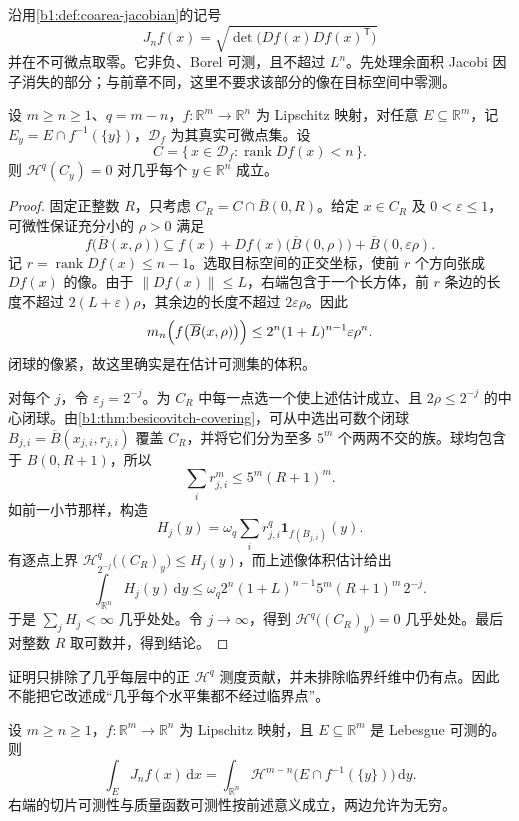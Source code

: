 沿用\cref{b1:def:coarea-jacobian}的记号
\[
 J_nf(x)
 =\sqrt{\det\bigl(Df(x)Df(x)^{\mathsf T}\bigr)}
\]
并在不可微点取零。它非负、Borel 可测，且不超过 \(L^n\)。先处理余面积 Jacobi 因子消失的部分；与前章不同，这里不要求该部分的像在目标空间中零测。

\begin{lemma}\label{b1:lem:critical-set-slices}
设 \(m\ge n\ge1\)、\(q=m-n\)，\(f:\mathbb R^m\to\mathbb R^n\) 为 Lipschitz 映射，对任意 \(E\subseteq\mathbb R^m\)，记 \(E_y=E\cap f^{-1}(\{y\})\)，\(\mathcal D_f\) 为其真实可微点集。设
\[
 C=\{\,x\in\mathcal D_f:\operatorname{rank}Df(x)<n\,\}.
\]
则 \(\mathcal H^q(C_y)=0\) 对几乎每个 \(y\in\mathbb R^n\) 成立。
\end{lemma}
\begin{proof}
固定正整数 \(R\)，只考虑 \(C_R=C\cap\overline B(0,R)\)。给定 \(x\in C_R\) 及 \(0<\varepsilon\leq1\)，可微性保证充分小的 \(\rho>0\) 满足
\[
 f\bigl(\overline B(x,\rho)\bigr)
 \subseteq f(x)+Df(x)\bigl(\overline B(0,\rho)\bigr)
                   +\overline B(0,\varepsilon\rho).
\]
记 \(r=\operatorname{rank}Df(x)\leq n-1\)。选取目标空间的正交坐标，使前 \(r\) 个方向张成 \(Df(x)\) 的像。由于 \(\|Df(x)\|\leq L\)，右端包含于一个长方体，前 \(r\) 条边的长度不超过 \(2(L+\varepsilon)\rho\)，其余边的长度不超过 \(2\varepsilon\rho\)。因此
\[
 m_n\Bigl(f\bigl(\overline B(x,\rho)\bigr)\Bigr)
 \leq 2^n(1+L)^{n-1}\varepsilon\rho^n.
\]
闭球的像紧，故这里确实是在估计可测集的体积。

对每个 \(j\)，令 \(\varepsilon_j=2^{-j}\)。为 \(C_R\) 中每一点选一个使上述估计成立、且 \(2\rho\leq2^{-j}\) 的中心闭球。由\cref{b1:thm:besicovitch-covering}，可从中选出可数个闭球 \(B_{j,i}=\overline B(x_{j,i},r_{j,i})\) 覆盖 \(C_R\)，并将它们分为至多 \(5^m\) 个两两不交的族。球均包含于 \(B(0,R+1)\)，所以
\[
 \sum_i r_{j,i}^m\leq5^m(R+1)^m.
\]
如前一小节那样，构造
\[
 H_j(y)=\omega_q\sum_i r_{j,i}^q
                                \mathbf1_{f(B_{j,i})}(y).
\]
有逐点上界 \(\mathcal H^q_{2^{-j}}\bigl((C_R)_y\bigr)\leq H_j(y)\)，而上述像体积估计给出
\[
 \int_{\mathbb R^n}H_j(y)\,\mathrm dy
 \leq
 \omega_q2^n(1+L)^{n-1}5^m(R+1)^m\,2^{-j}.
\]
于是 \(\sum_jH_j<\infty\) 几乎处处。令 \(j\to\infty\)，得到 \(\mathcal H^q\bigl((C_R)_y\bigr)=0\) 几乎处处。最后对整数 \(R\) 取可数并，得到结论。
\end{proof}

证明只排除了几乎每层中的正 \(\mathcal H^q\) 测度贡献，并未排除临界纤维中仍有点。因此不能把它改述成“几乎每个水平集都不经过临界点”。

\begin{theorem}[余面积公式]\label{b1:thm:coarea-formula}
设 \(m\geq n\geq1\)，\(f:\mathbb R^m\rightarrow\mathbb R^n\) 为 Lipschitz 映射，且 \(E\subseteq\mathbb R^m\) 是 Lebesgue 可测的。则
\[
 \int_EJ_nf(x)\,\mathrm dx
 =
 \int_{\mathbb R^n}
       \mathcal H^{m-n}\bigl(E\cap f^{-1}(\{y\})\bigr)\,\mathrm dy.
\]
右端的切片可测性与质量函数可测性按前述意义成立，两边允许为无穷。
\end{theorem}

